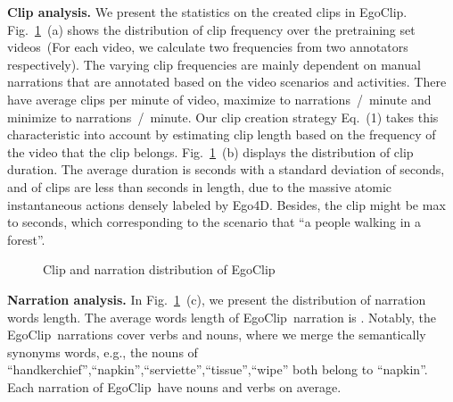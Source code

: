 \documentclass{article}
\newcommand{\dataset}{EgoClip}
\begin{document}
\noindent\textbf{Clip analysis.}
We present the statistics on the created clips in \dataset.
Fig.~\ref{fig_egoclip_clip}~(a) shows the distribution of clip frequency over the  pretraining set videos~(For each video, we calculate two frequencies from two annotators respectively).
The varying clip frequencies are mainly dependent on manual narrations that are annotated based on the video scenarios and activities. 
There have average  clips per minute of video, maximize to  narrations~/~minute and minimize to  narrations~/~minute.
Our clip creation strategy Eq.~(1) takes this characteristic into account by estimating clip length based on the frequency of the video that the clip belongs.
Fig.~\ref{fig_egoclip_clip}~(b) displays the distribution of clip duration. 
The average duration is  seconds with a standard deviation of  seconds, and  of clips are less than  seconds in length, 
due to the massive atomic instantaneous actions densely labeled by Ego4D. 
Besides, the clip might be max to  seconds, which corresponding to the scenario that ``a people walking in a forest''.

\begin{figure}[H]
\vspace{-0.5cm}
\centering
{}
\centering
\caption{Clip and narration distribution of \dataset}
\label{fig_egoclip_clip}
\vspace{-0.5cm}
\end{figure} 
\noindent\textbf{Narration analysis.}
In Fig.~\ref{fig_egoclip_clip}~(c), we present the distribution of narration words length.
The average words length of \dataset~narration is .
Notably, the \dataset~narrations cover  verbs and  nouns, where we merge the semantically synonyms words, e.g., the nouns of ``handkerchief'',``napkin'',``serviette'',``tissue'',``wipe'' both belong to ``napkin''.
Each narration of \dataset~have  nouns and  verbs on average.
\end{document}
